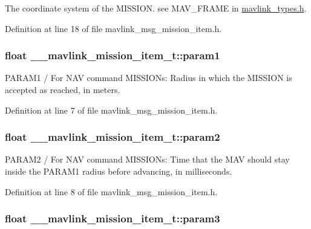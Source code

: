 The coordinate system of the M\-I\-S\-S\-I\-O\-N. see M\-A\-V\-\_\-\-F\-R\-A\-M\-E in \hyperlink{mavlink__types_8h}{mavlink\-\_\-types.\-h}. 



Definition at line 18 of file mavlink\-\_\-msg\-\_\-mission\-\_\-item.\-h.

\hypertarget{struct____mavlink__mission__item__t_a7b622b789be829088a8c9353946a4f28}{
\subsubsection[{param1}]{\setlength{\rightskip}{0pt plus 5cm}float \-\_\-\-\_\-mavlink\-\_\-mission\-\_\-item\-\_\-t\-::param1}}\label{struct____mavlink__mission__item__t_a7b622b789be829088a8c9353946a4f28}


P\-A\-R\-A\-M1 / For N\-A\-V command M\-I\-S\-S\-I\-O\-Ns\-: Radius in which the M\-I\-S\-S\-I\-O\-N is accepted as reached, in meters. 



Definition at line 7 of file mavlink\-\_\-msg\-\_\-mission\-\_\-item.\-h.

\hypertarget{struct____mavlink__mission__item__t_ad523243067b6c47919554e8802f14b5c}{
\subsubsection[{param2}]{\setlength{\rightskip}{0pt plus 5cm}float \-\_\-\-\_\-mavlink\-\_\-mission\-\_\-item\-\_\-t\-::param2}}\label{struct____mavlink__mission__item__t_ad523243067b6c47919554e8802f14b5c}


P\-A\-R\-A\-M2 / For N\-A\-V command M\-I\-S\-S\-I\-O\-Ns\-: Time that the M\-A\-V should stay inside the P\-A\-R\-A\-M1 radius before advancing, in milliseconds. 



Definition at line 8 of file mavlink\-\_\-msg\-\_\-mission\-\_\-item.\-h.

\hypertarget{struct____mavlink__mission__item__t_a183425d5376a9173373279cc43ffce25}{
\subsubsection[{param3}]{\setlength{\rightskip}{0pt plus 5cm}float \-\_\-\-\_\-mavlink\-\_\-mission\-\_\-item\-\_\-t\-::param3}}\label{struct____mavlink__mission__item__t_a183425d5376a9173373279cc43ffce25}


